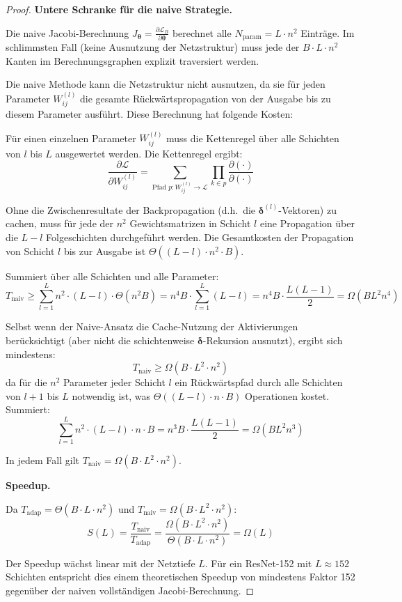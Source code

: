﻿\documentclass[a4paper,12pt]{article}
\theoremstyle{definition}
\begin{document}
\begin{proof}
	\textbf{Untere Schranke für die naive Strategie.}
	
	Die naive Jacobi-Berechnung $J_{\boldsymbol{\theta}} = \frac{\partial \mathcal{L}_B}{\partial \boldsymbol{\theta}}$ berechnet alle $N_{\mathrm{param}} = L \cdot n^2$ Einträge. Im schlimmsten Fall (keine Ausnutzung der Netzstruktur) muss jede der $B \cdot L \cdot n^2$ Kanten im Berechnungsgraphen explizit traversiert werden.
	
	Die naive Methode kann die Netzstruktur nicht ausnutzen, da sie für jeden Parameter $W^{(l)}_{ij}$ die gesamte Rückwärtspropagation von der Ausgabe bis zu diesem Parameter ausführt. Diese Berechnung hat folgende Kosten:
	
	Für einen einzelnen Parameter $W^{(l)}_{ij}$ muss die Kettenregel über alle Schichten von $l$ bis $L$ ausgewertet werden. Die Kettenregel ergibt:
	\[
	\frac{\partial \mathcal{L}}{\partial W^{(l)}_{ij}} = \sum_{\text{Pfad } p: W^{(l)}_{ij} \to \mathcal{L}} \prod_{k \in p} \frac{\partial(\cdot)}{\partial(\cdot)}
	\]
	
	Ohne die Zwischenresultate der Backpropagation (d.h.\ die $\boldsymbol{\delta}^{(l)}$-Vektoren) zu cachen, muss für jede der $n^2$ Gewichtsmatrizen in Schicht $l$ eine Propagation über die $L-l$ Folgeschichten durchgeführt werden. Die Gesamtkosten der Propagation von Schicht $l$ bis zur Ausgabe ist $\Theta((L-l) \cdot n^2 \cdot B)$.
	
	Summiert über alle Schichten und alle Parameter:
	\[
	T_{\mathrm{naiv}} \geq \sum_{l=1}^L n^2 \cdot (L - l) \cdot \Theta(n^2 B) = n^4 B \cdot \sum_{l=1}^L (L-l) = n^4 B \cdot \frac{L(L-1)}{2} = \Omega(B L^2 n^4)
	\]
	
	Selbst wenn der Naive-Ansatz die Cache-Nutzung der Aktivierungen berücksichtigt (aber nicht die schichtenweise $\boldsymbol{\delta}$-Rekursion ausnutzt), ergibt sich mindestens:
	\[
	T_{\mathrm{naiv}} \geq \Omega(B \cdot L^2 \cdot n^2)
	\]
	da für die $n^2$ Parameter jeder Schicht $l$ ein Rückwärtspfad durch alle Schichten von $l+1$ bis $L$ notwendig ist, was $\Theta((L-l) \cdot n \cdot B)$ Operationen kostet. Summiert:
	\[
	\sum_{l=1}^{L} n^2 \cdot (L - l) \cdot n \cdot B = n^3 B \cdot \frac{L(L-1)}{2} = \Omega(B L^2 n^3)
	\]
	
	In jedem Fall gilt $T_{\mathrm{naiv}} = \Omega(B \cdot L^2 \cdot n^2)$.
	
	\medskip
	\textbf{Speedup.}
	
	Da $T_{\mathrm{adap}} = \Theta(B \cdot L \cdot n^2)$ und $T_{\mathrm{naiv}} = \Omega(B \cdot L^2 \cdot n^2)$:
	\[
	S(L) = \frac{T_{\mathrm{naiv}}}{T_{\mathrm{adap}}} = \frac{\Omega(B \cdot L^2 \cdot n^2)}{\Theta(B \cdot L \cdot n^2)} = \Omega(L)
	\]
	
	Der Speedup wächst linear mit der Netztiefe $L$. Für ein ResNet-152 mit $L \approx 152$ Schichten entspricht dies einem theoretischen Speedup von mindestens Faktor 152 gegenüber der naiven vollständigen Jacobi-Berechnung.
\end{proof}
\end{document}

